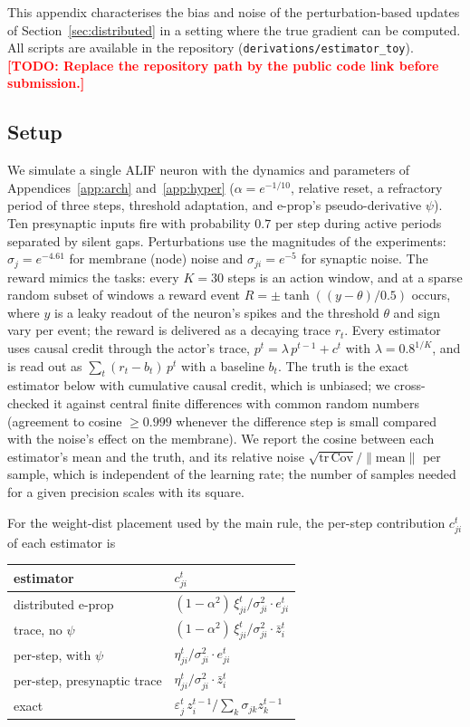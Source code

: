 \documentclass[10pt,twocolumn]{article}
\newcommand{\todo}[1]{\textcolor{red}{\bfseries[TODO: #1]}}
\begin{document}
This appendix characterises the bias and noise of the perturbation-based
updates of Section~\ref{sec:distributed} in a setting where the true gradient
can be computed. All scripts are available in the repository
(\texttt{derivations/estimator\_toy}).\todo{Replace the repository path by the
public code link before submission.}

\subsection{Setup}
\label{app:trace-setup}

We simulate a single ALIF neuron with the dynamics and parameters of
Appendices~\ref{app:arch} and~\ref{app:hyper} ($\alpha=e^{-1/10}$, relative
reset, a refractory period of three steps, threshold adaptation, and e-prop's
pseudo-derivative $\psi$). Ten presynaptic inputs fire with probability $0.7$
per step during active periods separated by silent gaps. Perturbations use the
magnitudes of the experiments: $\sigma_j=e^{-4.61}$ for membrane (node) noise
and $\sigma_{ji}=e^{-5}$ for synaptic noise. The reward mimics the tasks: every
$K=30$ steps is an action window, and at a sparse random subset of windows a
reward event $R=\pm\tanh((y-\theta)/0.5)$ occurs, where $y$ is a leaky readout of
the neuron's spikes and the threshold $\theta$ and sign vary per event; the
reward is delivered as a decaying trace $r_t$. Every estimator uses causal
credit through the actor's trace, $p^t=\lambda\,p^{t-1}+c^t$ with
$\lambda=0.8^{1/K}$, and is read out as $\sum_t (r_t-b_t)\,p^t$ with a baseline
$b_t$. The truth is the exact estimator below with cumulative causal credit,
which is unbiased; we cross-checked it against central finite differences with
common random numbers (agreement to cosine $\ge 0.999$ whenever the difference
step is small compared with the noise's effect on the membrane). We report the
cosine between each estimator's mean and the truth, and its relative noise
$\sqrt{\mathrm{tr}\,\mathrm{Cov}}/\lVert\text{mean}\rVert$ per sample, which is
independent of the learning rate; the number of samples needed for a given
precision scales with its square.

For the weight-dist placement used by the main rule, the per-step contribution
$c^t_{ji}$ of each estimator is

\begin{center}
\footnotesize
\begin{tabular}{@{}ll@{}}
\toprule
estimator & $c^t_{ji}$ \\
\midrule
distributed e-prop & $(1-\alpha^2)\,\xi^t_{ji}/\sigma_{ji}^2\cdot e^t_{ji}$ \\
trace, no $\psi$ & $(1-\alpha^2)\,\xi^t_{ji}/\sigma_{ji}^2\cdot \bar z^t_i$ \\
per-step, with $\psi$ & $\eta^t_{ji}/\sigma_{ji}^2\cdot e^t_{ji}$ \\
per-step, presynaptic trace & $\eta^t_{ji}/\sigma_{ji}^2\cdot \bar z^t_i$ \\
exact & $\varepsilon^t_j\, z^{t-1}_i \big/ \textstyle\sum_k \sigma_{jk} z^{t-1}_k$ \\
\bottomrule
\end{tabular}
\end{center}
\end{document}
